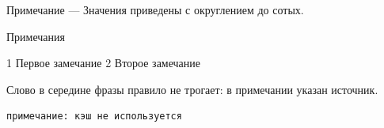 Примечание — Значения приведены с округлением до сотых.

Примечания

1 Первое замечание
2 Второе замечание

Слово в середине фразы правило не трогает: в примечании указан источник.

\begin{lstlisting}
примечание: кэш не используется
\end{lstlisting}
